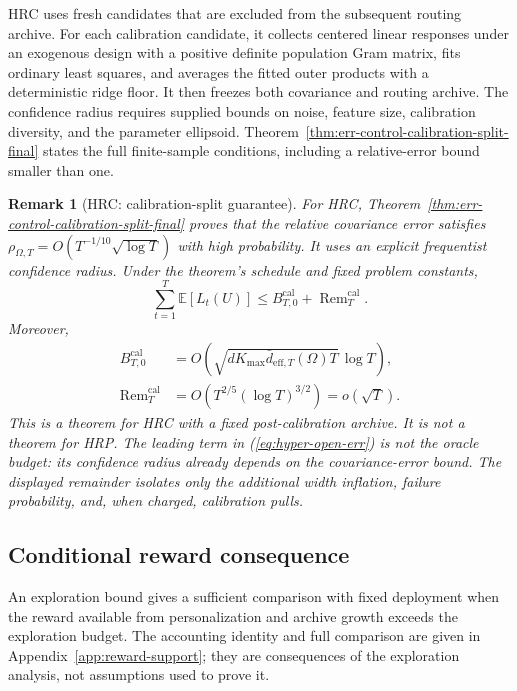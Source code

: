 \documentclass{article} %
\newtheorem{remark}{Remark}
\renewcommand{\eqref}[1]{\textup{(\ref{#1})}}
\begin{document}
HRC uses fresh candidates that are excluded from the subsequent routing
archive. For each calibration candidate, it collects centered linear
responses under an exogenous design with a positive definite population
Gram matrix, fits ordinary least squares, and averages the fitted outer
products with a deterministic ridge floor. It then freezes both covariance
and routing archive. The confidence radius requires supplied bounds on
noise, feature size, calibration diversity, and the parameter ellipsoid.
Theorem~\ref{thm:err-control-calibration-split-final} states the full
finite-sample conditions, including a relative-error bound smaller than one.

\begin{remark}[HRC: calibration-split guarantee]
For HRC, Theorem~\ref{thm:err-control-calibration-split-final} proves that the relative covariance error satisfies $\rho_{\Omega,T}=O(T^{-1/10}\sqrt{\log T})$ with high probability. It uses an explicit frequentist confidence radius. Under the theorem's schedule and fixed problem constants,
\begin{equation}
\label{eq:hyper-open-err}
\sum_{t=1}^{T}\mathbb{E}[L_t(U)]
\le
B_{T,0}^{\mathrm{cal}}
+
\operatorname{Rem}_T^{\mathrm{cal}}.
\end{equation}
Moreover,
\begin{equation}
\label{eq:hyper-open-rates}
\begin{aligned}
B_{T,0}^{\mathrm{cal}}
&=
O\!\left(
\sqrt{dK_{\max}\bar d_{\mathrm{eff},T}(\Omega)T}\,\log T
\right),\\
\operatorname{Rem}_T^{\mathrm{cal}}
&=
O\!\left(T^{2/5}(\log T)^{3/2}\right)
=o(\sqrt T).
\end{aligned}
\end{equation}
This is a theorem for HRC with a fixed post-calibration archive. It is not a theorem for HRP.
The leading term in \eqref{eq:hyper-open-err} is not the oracle budget: its
confidence radius already depends on the covariance-error bound. The displayed
remainder isolates only the additional width inflation, failure probability,
and, when charged, calibration pulls.
\end{remark}

\subsection{Conditional reward consequence}

An exploration bound gives a sufficient comparison with fixed deployment
when the reward available from personalization and archive growth exceeds
the exploration budget. The accounting identity and full comparison are
given in Appendix~\ref{app:reward-support}; they are consequences of the
exploration analysis, not assumptions used to prove it.
\end{document}
